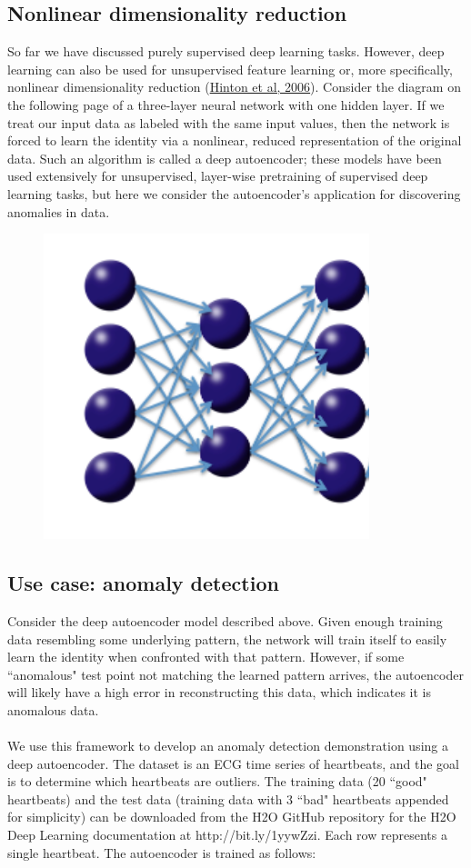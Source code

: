 \documentclass[11pt]{article}
\begin{document}
\subsection{Nonlinear dimensionality reduction} \label{4.1}
So far we have discussed purely supervised deep learning tasks. However, deep learning can also be used for unsupervised feature learning or, more specifically, nonlinear dimensionality reduction  (\href{http://www.cs.toronto.edu/~hinton/science.pdf}{Hinton et al, 2006}). Consider the diagram on the following page of a three-layer neural network with one hidden layer. If we treat our input data as labeled with the same input values, then the network is forced to learn the identity via a nonlinear, reduced representation of the original data. Such an algorithm is called a deep autoencoder; these models have been used extensively for unsupervised, layer-wise pretraining of supervised deep learning tasks, but here we consider the autoencoder's application for discovering anomalies in data. 
\\
\begin{figure}[h!]
\centering
\includegraphics[scale=0.7]{autoencoder.png}
\end{figure}
\subsection{Use case: anomaly detection} \label{4.2}
Consider the deep autoencoder model described above. Given enough training data resembling some underlying pattern, the network will train itself to easily learn the identity when confronted with that pattern. However, if some ``anomalous" test point not matching the learned pattern arrives, the autoencoder will likely have a high error in reconstructing this data, which indicates it is anomalous data.
\\
\\
We use this framework to develop an anomaly detection demonstration using a deep autoencoder. The dataset is an ECG time series of heartbeats, and the goal is to determine which heartbeats are outliers. The training data (20 ``good" heartbeats) and the test data (training data with 3 ``bad" heartbeats appended for simplicity) can be downloaded from the H2O GitHub repository for the H2O Deep Learning documentation at http://bit.ly/1yywZzi. Each row represents a single heartbeat. The autoencoder is trained as follows: 
\end{document}
